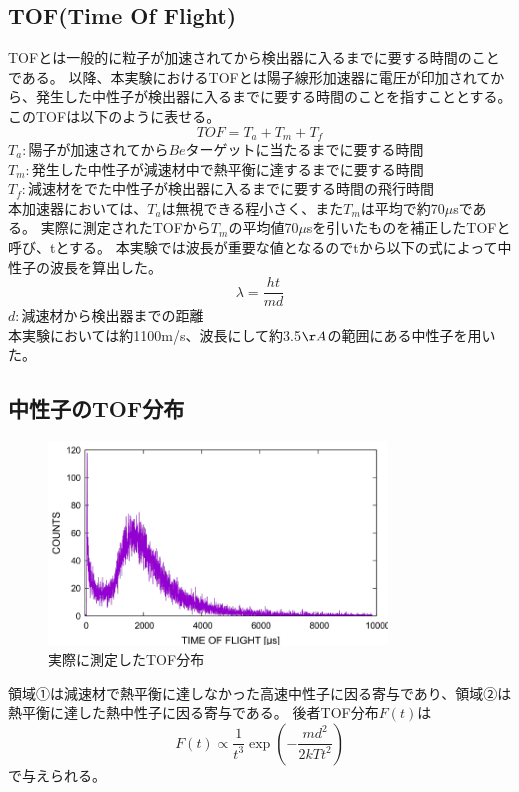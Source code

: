 \subsection {TOF(Time Of Flight)}
TOFとは一般的に粒子が加速されてから検出器に入るまでに要する時間のことである。
以降、本実験におけるTOFとは陽子線形加速器に電圧が印加されてから、発生した中性子が検出器に入るまでに要する時間のことを指すこととする。
このTOFは以下のように表せる。
\begin{equation}TOF=T_a+T_m+T_f\end{equation}
$T_a:陽子が加速されてからBeターゲットに当たるまでに要する時間$\\
$T_m:発生した中性子が減速材中で熱平衡に達するまでに要する時間$\\
$T_f:減速材をでた中性子が検出器に入るまでに要する時間の飛行時間$\\
本加速器においては、$T_a$は無視できる程小さく、また$T_m$は平均で約70$\mu$sである。
実際に測定されたTOFから$T_m$の平均値70$\mu$sを引いたものを補正したTOFと呼び、tとする。
本実験では波長が重要な値となるのでtから以下の式によって中性子の波長を算出した。
\begin{equation}
{\lambda}={\frac{ht}{md}}
\end{equation}
$d:減速材から検出器までの距離$\\
本実験においては約1100m/s、波長にして約3.5$\AA$の範囲にある中性子を用いた。
\subsection {中性子のTOF分布}
\begin{figure}[h]
\centering
\includegraphics[width=9cm]{accelerator/TOF.pdf}
\caption{実際に測定したTOF分布}
\end{figure}
領域①は減速材で熱平衡に達しなかった高速中性子に因る寄与であり、領域②は熱平衡に達した熱中性子に因る寄与である。
後者TOF分布$F(t)$は\begin{equation}F(t)\propto \frac{1}{t^{3}}\exp(-\frac{md^2}{2kTt^2}) \end{equation}で与えられる。
